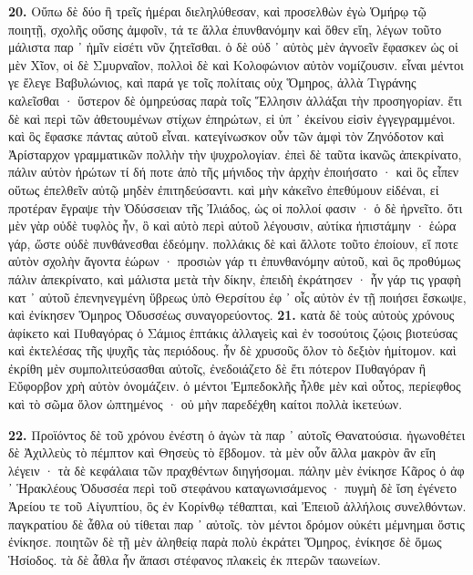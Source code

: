 \documentclass[a4paper, 11pt, oneside, polutonikogreek, german]{article}
\begin{document}
\textbf{20.} Οὔπω δὲ δύο ἢ τρεῖς ἡμέραι διεληλύθεσαν, καὶ προσελθὼν ἐγὼ Ὁμήρῳ τῷ ποιητῇ, σχολῆς οὔσης ἀμφοῖν, τά τε ἄλλα ἐπυνθανόμην καὶ ὅθεν εἴη, λέγων τοῦτο μάλιστα παρ ᾽ ἡμῖν εἰσέτι νῦν ζητεῖσθαι. ὁ δὲ οὐδ ᾽ αὐτὸς μὲν ἀγνοεῖν ἔφασκεν ὡς οἱ μὲν Χῖον, οἱ δὲ Σμυρναῖον, πολλοὶ δὲ καὶ Κολοφώνιον αὐτὸν νομίζουσιν. εἶναι μέντοι γε ἔλεγε Βαβυλώνιος, καὶ παρά γε τοῖς πολίταις οὐχ Ὅμηρος, ἀλλὰ Τιγράνης καλεῖσθαι · ὕστερον δὲ ὁμηρεύσας παρὰ τοῖς Ἕλλησιν ἀλλάξαι τὴν προσηγορίαν. ἔτι δὲ καὶ περὶ τῶν ἀθετουμένων στίχων ἐπηρώτων, εἰ ὑπ ᾽ ἐκείνου εἰσὶν ἐγγεγραμμένοι. καὶ ὃς ἔφασκε πάντας αὐτοῦ εἶναι. κατεγίνωσκον οὖν τῶν ἀμφὶ τὸν Ζηνόδοτον καὶ Ἀρίσταρχον γραμματικῶν πολλὴν τὴν ψυχρολογίαν. ἐπεὶ δὲ ταῦτα ἱκανῶς ἀπεκρίνατο, πάλιν αὐτὸν ἠρώτων τί δή ποτε ἀπὸ τῆς μήνιδος τὴν ἀρχὴν ἐποιήσατο · καὶ ὃς εἶπεν οὕτως ἐπελθεῖν αὐτῷ μηδὲν ἐπιτηδεύσαντι. καὶ μὴν κἀκεῖνο ἐπεθύμουν εἰδέναι, εἰ προτέραν ἔγραψε τὴν Ὀδύσσειαν τῆς Ἰλιάδος, ὡς οἱ πολλοί φασιν · ὁ δὲ ἠρνεῖτο. ὅτι μὲν γὰρ οὐδὲ τυφλὸς ἦν, ὃ καὶ αὐτὸ περὶ αὐτοῦ λέγουσιν, αὐτίκα ἠπιστάμην · ἑώρα γάρ, ὥστε οὐδὲ πυνθάνεσθαι ἐδεόμην. πολλάκις δὲ καὶ ἄλλοτε τοῦτο ἐποίουν, εἴ ποτε αὐτὸν σχολὴν ἄγοντα ἑώρων · προσιὼν γάρ τι ἐπυνθανόμην αὐτοῦ, καὶ ὃς προθύμως πάλιν ἀπεκρίνατο, καὶ μάλιστα μετὰ τὴν δίκην, ἐπειδὴ ἐκράτησεν · ἦν γάρ τις γραφὴ κατ ᾽ αὐτοῦ ἐπενηνεγμένη ὕβρεως ὑπὸ Θερσίτου ἐφ ᾽ οἷς αὐτὸν ἐν τῇ ποιήσει ἔσκωψε, καὶ ἐνίκησεν Ὅμηρος Ὀδυσσέως συναγορεύοντος. \textbf{21.} κατὰ δὲ τοὺς αὐτοὺς χρόνους ἀφίκετο καὶ Πυθαγόρας ὁ Σάμιος ἑπτάκις ἀλλαγεὶς καὶ ἐν τοσούτοις ζῴοις βιοτεύσας καὶ ἐκτελέσας τῆς ψυχῆς τὰς περιόδους. ἦν δὲ χρυσοῦς ὅλον τὸ δεξιὸν ἡμίτομον. καὶ ἐκρίθη μὲν συμπολιτεύσασθαι αὐτοῖς, ἐνεδοιάζετο δὲ ἔτι πότερον Πυθαγόραν ἢ Εὔφορβον χρὴ αὐτὸν ὀνομάζειν. ὁ μέντοι Ἐμπεδοκλῆς ἦλθε μὲν καὶ οὗτος, περίεφθος καὶ τὸ σῶμα ὅλον ὠπτημένος · οὐ μὴν παρεδέχθη καίτοι πολλὰ ἱκετεύων.

\textbf{22.} Προϊόντος δὲ τοῦ χρόνου ἐνέστη ὁ ἀγὼν τὰ παρ ᾽ αὐτοῖς Θανατούσια. ἠγωνοθέτει δὲ Ἀχιλλεὺς τὸ πέμπτον καὶ Θησεὺς τὸ ἕβδομον. τὰ μὲν οὖν ἄλλα μακρὸν ἂν εἴη λέγειν · τὰ δὲ κεφάλαια τῶν πραχθέντων διηγήσομαι. πάλην μὲν ἐνίκησε Κᾶρος ὁ ἀφ ᾽ Ἡρακλέους Ὀδυσσέα περὶ τοῦ στεφάνου καταγωνισάμενος · πυγμὴ δὲ ἴση ἐγένετο Ἀρείου τε τοῦ Αἰγυπτίου, ὃς ἐν Κορίνθῳ τέθαπται, καὶ Ἐπειοῦ ἀλλήλοις συνελθόντων. παγκρατίου δὲ ἆθλα οὐ τίθεται παρ ᾽ αὐτοῖς. τὸν μέντοι δρόμον οὐκέτι μέμνημαι ὅστις ἐνίκησε. ποιητῶν δὲ τῇ μὲν ἀληθείᾳ παρὰ πολὺ ἐκράτει Ὅμηρος, ἐνίκησε δὲ ὅμως Ἡσίοδος. τὰ δὲ ἆθλα ἦν ἅπασι στέφανος πλακεὶς ἐκ πτερῶν ταωνείων.
\end{document}
